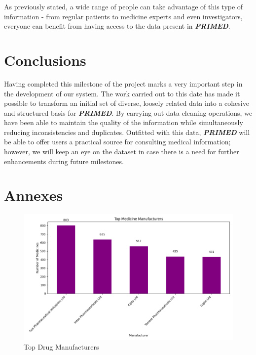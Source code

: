 \documentclass[sigconf]{acmart}
\begin{document}
As previously stated, a wide range of people can take advantage of this type of information - from regular patients to medicine experts and even investigators, everyone can benefit from having access to the data present in \textit{\textbf{PRIMED}}.

\section{Conclusions}

Having completed this milestone of the project marks a very important step in the development of our system. The work carried out to this date has made it possible to transform an initial set of diverse, loosely related data into a cohesive and structured basis for \textit{\textbf{PRIMED}}. By carrying out data cleaning operations, we have been able to maintain the quality of the information while simultaneously reducing inconsistencies and duplicates. Outfitted with this data, \textit{\textbf{PRIMED}} will be able to offer users a practical source for consulting medical information; however, we will keep an eye on the dataset in case there is a need for further enhancements during future milestones.

\appendix
\section{Annexes}

\begin{figure}[H]
	\centering
	\includegraphics[width=\linewidth]{graphic1.png}
	\caption{Top Drug Manufacturers}
	\label{fig:uml}
  \end{figure}
\end{document}
